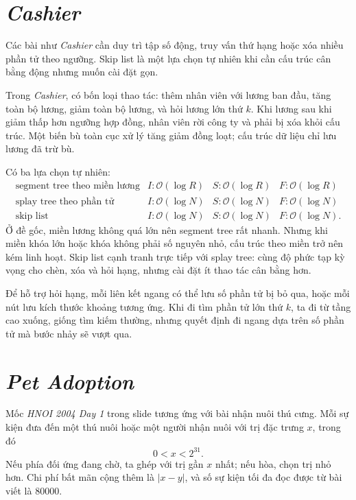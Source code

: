 \documentclass[11pt]{article}
\newcommand{\Oh}{\mathcal{O}}
\begin{document}
\section{\textit{Cashier}}

Các bài như \textit{Cashier} cần duy trì tập số động, truy vấn thứ hạng hoặc
xóa nhiều phần tử theo ngưỡng. Skip list là một lựa chọn tự nhiên khi cần cấu
trúc cân bằng động nhưng muốn cài đặt gọn.

Trong \textit{Cashier}, có bốn loại thao tác: thêm nhân viên với lương ban
đầu, tăng toàn bộ lương, giảm toàn bộ lương, và hỏi lương lớn thứ \(k\). Khi
lương sau khi giảm thấp hơn ngưỡng hợp đồng, nhân viên rời công ty và phải bị
xóa khỏi cấu trúc. Một biến bù toàn cục xử lý tăng giảm đồng loạt; cấu trúc
dữ liệu chỉ lưu lương đã trừ bù.

Có ba lựa chọn tự nhiên:
\[
\begin{array}{llll}
\text{segment tree theo miền lương} & I:\Oh(\log R) & S:\Oh(\log R) &
F:\Oh(\log R)\\
\text{splay tree theo phần tử} & I:\Oh(\log N) & S:\Oh(\log N) &
F:\Oh(\log N)\\
\text{skip list} & I:\Oh(\log N) & S:\Oh(\log N) &
F:\Oh(\log N).
\end{array}
\]
Ở đề gốc, miền lương không quá lớn nên segment tree rất nhanh. Nhưng khi miền
khóa lớn hoặc khóa không phải số nguyên nhỏ, cấu trúc theo miền trở nên kém
linh hoạt. Skip list cạnh tranh trực tiếp với splay tree: cùng độ phức tạp
kỳ vọng cho chèn, xóa và hỏi hạng, nhưng cài đặt ít thao tác cân bằng hơn.

Để hỗ trợ hỏi hạng, mỗi liên kết ngang có thể lưu số phần tử bị bỏ qua, hoặc
mỗi nút lưu kích thước khoảng tương ứng. Khi đi tìm phần tử lớn thứ \(k\), ta
đi từ tầng cao xuống, giống tìm kiếm thường, nhưng quyết định đi ngang dựa
trên số phần tử mà bước nhảy sẽ vượt qua.

\section{\textit{Pet Adoption}}

Mốc \textit{HNOI 2004 Day 1} trong slide tương ứng với bài nhận nuôi thú
cưng. Mỗi sự kiện đưa đến một thú nuôi hoặc một người nhận nuôi với trị đặc
trưng \(x\), trong đó
\[
  0<x<2^{31}.
\]
Nếu phía đối ứng đang chờ, ta ghép với trị gần \(x\) nhất; nếu hòa, chọn trị
nhỏ hơn. Chi phí bất mãn cộng thêm là \(|x-y|\), và số sự kiện tối đa đọc
được từ bài viết là \(80000\).
\end{document}
